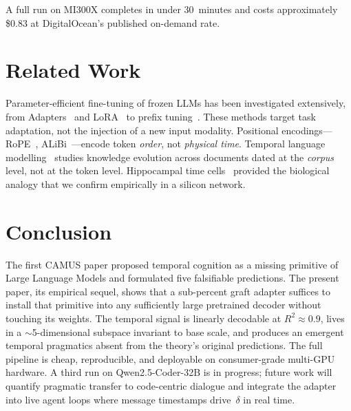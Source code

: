 \documentclass[10pt,twocolumn,letterpaper]{article}
\begin{document}
A full run on MI300X completes in under 30~minutes and costs approximately \$0.83 at DigitalOcean's published on-demand rate.

\section{Related Work}

Parameter-efficient fine-tuning of frozen LLMs has been investigated extensively, from Adapters~\cite{howard2013} and LoRA~\cite{hu2021lora} to prefix tuning~\cite{li2021prefix}. These methods target task adaptation, not the injection of a new input modality. Positional encodings---RoPE~\cite{su2021rope}, ALiBi~\cite{press2021alibi}---encode token \emph{order}, not \emph{physical time}. Temporal language modelling~\cite{dhingra2021,wang2023} studies knowledge evolution across documents dated at the \emph{corpus} level, not at the token level. Hippocampal time cells~\cite{macdonald2011} provided the biological analogy that we confirm empirically in a silicon network.

\section{Conclusion}

The first CAMUS paper proposed temporal cognition as a missing primitive of Large Language Models and formulated five falsifiable predictions. The present paper, its empirical sequel, shows that a sub-percent graft adapter suffices to install that primitive into any sufficiently large pretrained decoder without touching its weights. The temporal signal is linearly decodable at $R^2 \approx 0.9$, lives in a $\sim$5-dimensional subspace invariant to base scale, and produces an emergent temporal pragmatics absent from the theory's original predictions. The full pipeline is cheap, reproducible, and deployable on consumer-grade multi-GPU hardware. A third run on Qwen2.5-Coder-32B is in progress; future work will quantify pragmatic transfer to code-centric dialogue and integrate the adapter into live agent loops where message timestamps drive~$\delta$ in real time.
\end{document}
